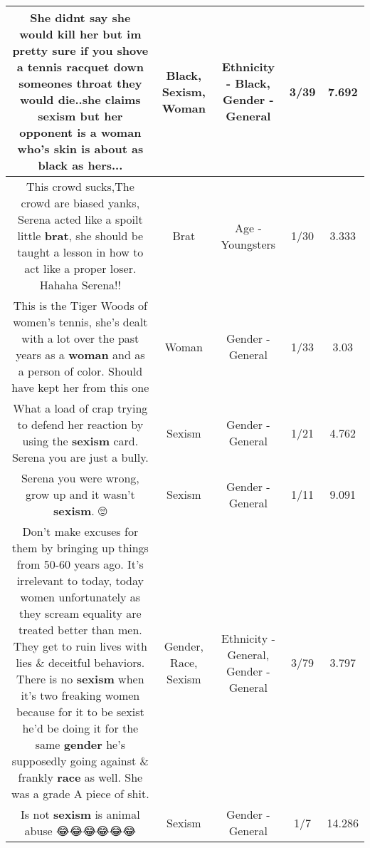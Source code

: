 \documentclass[11pt]{article}
\newlength\mylength
\begin{document}
\begin{center}
\begin{longtable}{|C{.65\mylength}|C{.30\mylength}|C{.12\mylength}|C{.12\mylength}|C{.12\mylength}|}
  \small She didnt say she would kill her but im pretty sure if you shove a tennis racquet down someones throat they would die..she claims \textbf{sexism} but her opponent is a \textbf{woman} who's skin is about as \textbf{black} as hers...\normalsize   & Black, Sexism, Woman & Ethnicity - Black, Gender - General & 3/39 & 7.692 \\  \hline
  \small This crowd sucks,The crowd are biased yanks, Serena acted like a spoilt little \textbf{brat}, she should be taught a lesson in how to act like a proper loser.  Hahaha Serena!!\normalsize   & Brat & Age - Youngsters & 1/30 & 3.333 \\  \hline
  \small This is the Tiger Woods of women's tennis, she's dealt with a lot over the past years as a \textbf{woman} and as a person of color. Should have kept her from this one\normalsize   & Woman & Gender - General & 1/33 & 3.03 \\  \hline
  \small What a load of crap trying to defend her reaction by using the \textbf{sexism} card. Serena you are just a bully.\normalsize   & Sexism & Gender - General & 1/21 & 4.762 \\  \hline
  \small Serena you were wrong, grow up and it wasn't \textbf{sexism}. 🙄\normalsize   & Sexism & Gender - General & 1/11 & 9.091 \\  \hline
  \small Don't make excuses for them by bringing up things from 50-60 years ago. It's irrelevant to today, today women unfortunately as they scream equality are treated better than men. They get to ruin lives with lies \& deceitful behaviors. There is no \textbf{sexism} when it's two freaking women because for it to be sexist he'd be doing it for the same \textbf{gender} he's supposedly going against \& frankly \textbf{race} as well. She was a grade A piece of shit.\normalsize   & Gender, Race, Sexism & Ethnicity - General, Gender - General & 3/79 & 3.797 \\  \hline
  \small Is not \textbf{sexism} is animal abuse 😂😂😂😂😂😂\normalsize   & Sexism & Gender - General & 1/7 & 14.286 \\  \hline

\end{longtable}
\end{center}
\end{document}
